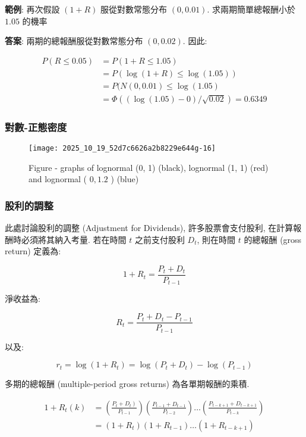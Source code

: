 \documentclass[letterpaper]{article}
\begin{document}
		\textbf{範例}: 再次假設 $ (1+R) $ 服從對數常態分布 $ (0, 0.01) $. 求兩期簡單總報酬小於 $1.05$ 的機率
		
		\textbf{答案}: 兩期的總報酬服從對數常態分布 $ (0, 0.02) $. 因此: 
		
		
		$$
		\begin{aligned}
			P (R \leq 0.05) & =P (1+R \leq 1.05) \\
			& =P (\log (1+R) \leq \log (1.05) ) \\
			& =P (N (0, 0.01) \leq \log (1.05) \\
			& =\Phi ( (\log (1.05) -0) / \sqrt{0.02}) =0.6349
		\end{aligned}
		$$
		
		
		\subsubsection{對數-正態密度}
		\begin{figure}[h]
			\begin{center}
				
				
				\texttt{[image: 2025\_10\_19\_52d7c6626a2b8229e644g-16]}
				\caption{Figure - graphs of lognormal (0, 1) (black), lognormal (1, 1) (red) and lognormal ( $0, 1.2$ ) (blue) }
			\end{center}
		\end{figure}
		
		\subsubsection{股利的調整}
		此處討論股利的調整 (Adjustment for Dividends), 許多股票會支付股利, 在計算報酬時必須將其納入考量. 若在時間 \( t \) 之前支付股利 \( D_t \), 則在時間 \( t \) 的總報酬 (gross return) 定義為: 
		
		
		$$
		1+R_{t}=\frac{P_{t}+D_{t}}{P_{t-1}}
		$$
		
		淨收益為: 
		
		$$
		R_{t}=\frac{P_{t}+D_{t}-P_{t-1}}{P_{t-1}}
		$$
		
		以及: 
		
		$$
		r_{t}=\log \left (1+R_{t}\right) =\log \left (P_{t}+D_{t}\right) -\log \left (P_{t-1}\right) 
		$$
		
		多期的總報酬 (multiple-period gross returns) 為各單期報酬的乘積.
		
		$$
		\begin{aligned}
			1+R_{t} (k) & =\left (\frac{\left.P_{t}+D_{t}\right) }{P_{t-1}}\right) \left (\frac{P_{t-1}+D_{t-1}}{P_{t-2}}\right) \ldots\left (\frac{P_{t-k+1}+D_{t-k+1}}{P_{t-k}}\right) \\
			& =\left (1+R_{t}\right) \left (1+R_{t-1}\right) \ldots\left (1+R_{t-k+1}\right) 
		\end{aligned}
		$$
		
\end{document}
